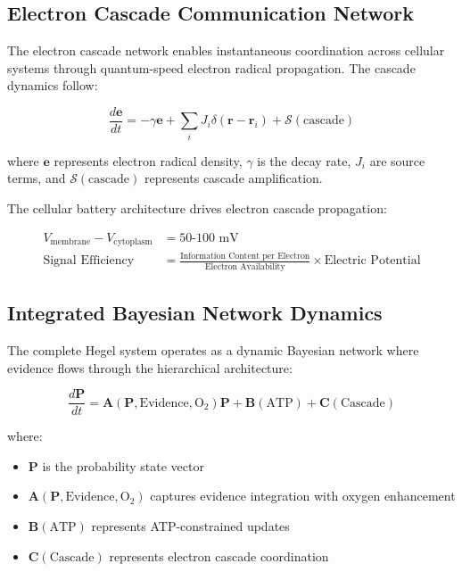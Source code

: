\documentclass[12pt,a4paper]{article}
\begin{document}
\subsection{Electron Cascade Communication Network}

The electron cascade network enables instantaneous coordination across cellular systems through quantum-speed electron radical propagation. The cascade dynamics follow:

\begin{equation}
\frac{d\mathbf{e}}{dt} = -\gamma \mathbf{e} + \sum_i J_i \delta(\mathbf{r} - \mathbf{r}_i) + \mathcal{S}(\text{cascade})
\end{equation}

where $\mathbf{e}$ represents electron radical density, $\gamma$ is the decay rate, $J_i$ are source terms, and $\mathcal{S}(\text{cascade})$ represents cascade amplification.

The cellular battery architecture drives electron cascade propagation:

\begin{align}
V_{\text{membrane}} - V_{\text{cytoplasm}} &= 50\text{-}100 \text{ mV} \\
\text{Signal Efficiency} &= \frac{\text{Information Content per Electron}}{\text{Electron Availability}} \times \text{Electric Potential}
\end{align}

\subsection{Integrated Bayesian Network Dynamics}

The complete Hegel system operates as a dynamic Bayesian network where evidence flows through the hierarchical architecture:

\begin{equation}
\frac{d\mathbf{P}}{dt} = \mathbf{A}(\mathbf{P}, \text{Evidence}, \text{O}_2) \mathbf{P} + \mathbf{B}(\text{ATP}) + \mathbf{C}(\text{Cascade})
\end{equation}

where:
\begin{itemize}
\item $\mathbf{P}$ is the probability state vector
\item $\mathbf{A}(\mathbf{P}, \text{Evidence}, \text{O}_2)$ captures evidence integration with oxygen enhancement
\item $\mathbf{B}(\text{ATP})$ represents ATP-constrained updates
\item $\mathbf{C}(\text{Cascade})$ represents electron cascade coordination
\end{itemize}
\end{document}
